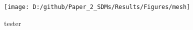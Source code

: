 \documentclass[
]{article}
\begin{document}
\setcounter{table}{0}  \renewcommand{\thetable}{S\arabic{table}} \setcounter{figure}{0} \renewcommand{\thefigure}{S\arabic{figure}}

\newpage
\begin{landscape}
\begin{figure}
\texttt{[image: D:/github/Paper\_2\_SDMs/Results/Figures/mesh]} \caption{tester}\label{fig:PCA}
\end{figure}

\end{landscape}

\newpage
\end{document}
